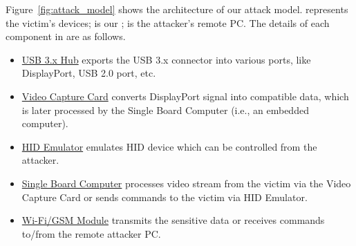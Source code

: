 Figure~\ref{fig:attack_model} shows the architecture of our attack model.  represents the victim's devices;  is our \tool;  is the attacker's remote PC. The details of each component in \tool are as follows.


\begin{itemize}
	
	\item\underline{USB 3.x Hub} exports the USB 3.x connector into various ports, like DisplayPort, USB 2.0 port, etc.
	
	\item\underline{Video Capture Card} converts DisplayPort signal into compatible data, which is later processed by the Single Board Computer (i.e., an embedded computer).
	
	\item\underline{HID Emulator} emulates HID device which can be controlled from the attacker.
	
	\item\underline{Single Board Computer} processes video stream from the victim via the Video Capture Card or sends commands to the victim via HID Emulator.
	
	\item\underline{Wi-Fi/GSM Module} transmits the sensitive data or receives commands to/from the remote attacker PC.

\end{itemize}


